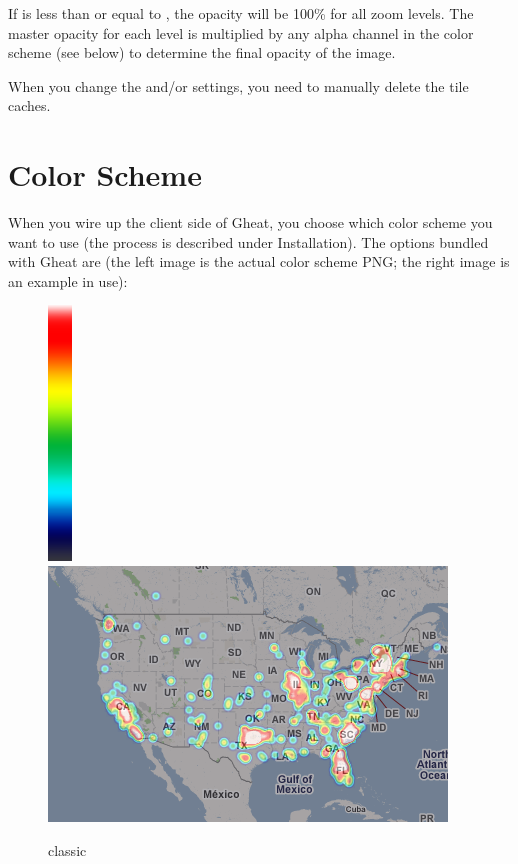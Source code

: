 \documentclass{manual}
\begin{document}
If  is less than or equal to , the
opacity will be 100\% for all zoom levels. The master opacity for each level is
multiplied by any alpha channel in the color scheme (see below) to determine the
final opacity of the image.

When you change the  and/or  settings,
you need to manually delete the tile caches.

\section{Color Scheme}

When you wire up the client side of Gheat, you choose which color scheme you
want to use (the process is described under Installation). The options
bundled with Gheat are (the left image is the actual color scheme PNG; the right
image is an example in use):

\begin{figure}[htp]
\includegraphics[bb=0 0 24 256]{color-schemes/classic.png}
\includegraphics[bb=0 0 400 256]{img/cs-classic.png}
\caption{classic}\label{fig:classic}
\end{figure}
\end{document}
